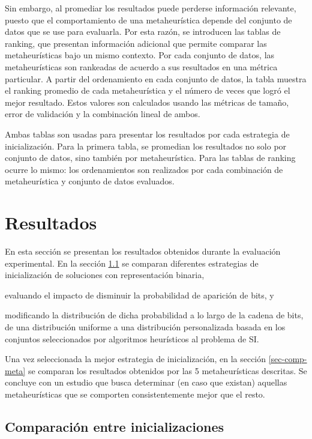 Sin embargo, al promediar los resultados puede perderse información relevante, puesto que el comportamiento de una metaheurística depende del conjunto de datos que se use para evaluarla. Por esta razón, se introducen las tablas de ranking, que presentan información adicional que permite comparar las metaheurísticas bajo un mismo contexto. Por cada conjunto de datos, las metaheurísticas son rankeadas de acuerdo a sus resultados en una métrica particular. A partir del ordenamiento en cada conjunto de datos, la tabla muestra el ranking promedio de cada metaheurística y el número de veces que logró el mejor resultado. Estos valores son calculados usando las métricas de tamaño, error de validación y la combinación lineal de ambos.

Ambas tablas son usadas para presentar los resultados por cada estrategia de inicialización. Para la primera tabla, se promedian los resultados no solo por conjunto de datos, sino también por metaheurística. Para las tablas de ranking ocurre lo mismo: los ordenamientos son realizados por cada combinación de metaheurística y conjunto de datos evaluados.

\section{Resultados}
\label{sec-res}

En esta sección se presentan los resultados obtenidos durante la evaluación experimental. En la sección \ref{sec-comp-inits} se comparan diferentes estrategias de inicialización de soluciones con representación binaria,
\begin{inparaenum}
\item evaluando el impacto de disminuir la probabilidad de aparición de bits, y
\item modificando la distribución de dicha probabilidad a lo largo de la cadena de bits, de una distribución uniforme a una distribución personalizada basada en los conjuntos seleccionados por algoritmos heurísticos al problema de SI.
\end{inparaenum}
Una vez seleccionada la mejor estrategia de inicialización, en la sección \ref{sec-comp-meta} se comparan los resultados obtenidos por las 5 metaheurísticas descritas. Se concluye con un estudio que busca determinar (en caso que existan) aquellas metaheurísticas que se comporten consistentemente mejor que el resto.

\subsection{Comparación entre inicializaciones}
\label{sec-comp-inits}

